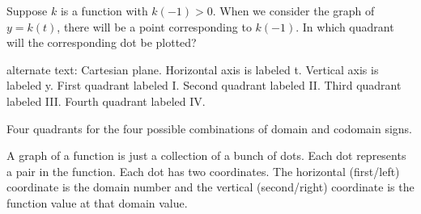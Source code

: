 \documentclass{ximera}
\begin{document}
\begin{question} 


Suppose $k$ is a function with $k(-1)>0$. When we consider the graph of $y=k(t)$, there will be a point corresponding to $k(-1)$. In which quadrant will the corresponding dot be plotted?

\begin{image}
\end{image}


\textcolor{gray!90}{alternate text: Cartesian plane. Horizontal axis is labeled t. Vertical axis is labeled y. First quadrant labeled I. Second quadrant labeled II. Third quadrant labeled III. Fourth quadrant labeled IV.}



\begin{multipleChoice}
\end{multipleChoice}

\end{question}









Four quadrants for the four possible combinations of domain and codomain signs. 


A graph of a function is just a collection of a bunch of dots.  Each dot represents a pair in the function.  Each dot has two coordinates.  The horizontal (first/left) coordinate is the domain number and the vertical (second/right) coordinate is the function value at that domain value.
\end{document}
